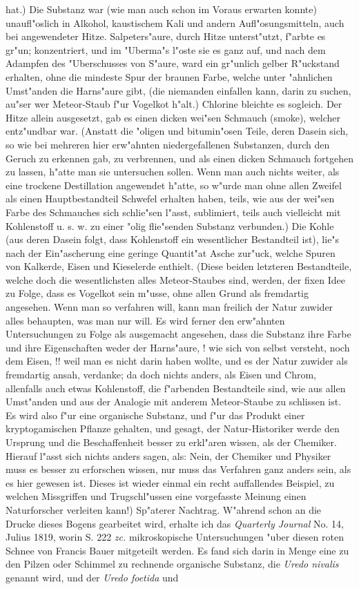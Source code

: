 \documentclass[a4paper, 11pt, oneside, polutonikogreek, german]{article}
\begin{document}
hat.) Die Substanz war (wie man auch schon im Voraus erwarten konnte) unaufl"oslich in Alkohol, kaustischem Kali und andern Aufl"osungsmitteln, auch bei angewendeter Hitze. Salpeters"aure, durch Hitze unterst"utzt, f"arbte es gr"un; konzentriert, und im "Uberma"s l"oste sie es ganz auf, und nach dem Adampfen des "Uberschusses von S"aure, ward ein gr"unlich gelber R"uckstand erhalten, ohne die mindeste Spur der braunen Farbe, welche unter "ahnlichen Umst"anden die Harns"aure gibt, (die niemanden einfallen kann, darin zu suchen, au"ser wer Meteor-Staub f"ur Vogelkot h"alt.) Chlorine bleichte es sogleich. Der Hitze allein ausgesetzt, gab es einen dicken wei"sen Schmauch (smoke), welcher entz"undbar war. (Anstatt die "oligen und bitumin"osen Teile, deren Dasein sich, so wie bei mehreren hier erw"ahnten niedergefallenen Substanzen, durch den Geruch zu erkennen gab, zu verbrennen, und als einen dicken Schmauch fortgehen zu lassen, h"atte man sie untersuchen sollen. Wenn man auch nichts weiter, als eine trockene Destillation angewendet h"atte, so w"urde man ohne allen Zweifel als einen Hauptbestandteil Schwefel erhalten haben, teils, wie aus der wei"sen Farbe des Schmauches sich schlie"sen l"asst, sublimiert, teils auch vielleicht mit Kohlenstoff u. s. w. zu einer "olig flie"senden Substanz verbunden.) Die Kohle (aus deren Dasein folgt, dass Kohlenstoff ein wesentlicher Bestandteil ist), lie"s nach der Ein"ascherung eine geringe Quantit"at Asche zur"uck, welche Spuren von Kalkerde, Eisen und Kieselerde enthielt. (Diese beiden letzteren Bestandteile, welche doch die wesentlichsten alles Meteor-Staubes sind, werden, der fixen Idee zu Folge, dass es Vogelkot sein m"usse, ohne allen Grund als fremdartig angesehen. Wenn man so verfahren will, kann man freilich der Natur zuwider alles behaupten, was man nur will. Es wird ferner den erw"ahnten Untersuchungen zu Folge als ausgemacht angesehen, dass die Substanz ihre Farbe und ihre Eigenschaften weder der Harns"aure, ! wie sich von selbst versteht, noch dem Eisen, !! weil man es nicht darin haben wollte, und es der Natur zuwider als fremdartig ansah, verdanke; da doch nichts anders, als Eisen und Chrom, allenfalls auch etwas Kohlenstoff, die f"arbenden Bestandteile sind, wie aus allen Umst"anden und aus der Analogie mit anderem Meteor-Staube zu schlissen ist. Es wird also f"ur eine organische Substanz, und f"ur das Produkt einer kryptogamischen Pflanze gehalten, und gesagt, der Natur-Historiker werde den Ursprung und die Beschaffenheit besser zu erkl"aren wissen, als der Chemiker. Hierauf l"asst sich nichts anders sagen, als: Nein, der Chemiker und Physiker muss es besser zu erforschen wissen, nur muss das Verfahren ganz anders sein, als es hier gewesen ist. Dieses ist wieder einmal ein recht auffallendes Beispiel, zu welchen Missgriffen und Trugschl"ussen eine vorgefasste Meinung einen Naturforscher verleiten kann!) Sp"aterer Nachtrag. W"ahrend schon an die Drucke dieses Bogens gearbeitet wird, erhalte ich das \emph{Quarterly Journal} No. 14, Julius 1819, worin S. 222 \emph{zc.} mikroskopische Untersuchungen "uber diesen roten Schnee von Francis Bauer mitgeteilt werden. Es fand sich darin in Menge eine zu den Pilzen oder Schimmel zu rechnende organische Substanz, die \emph{Uredo nivalis} genannt wird, und der \emph{Uredo foetida} und 
\end{document}
